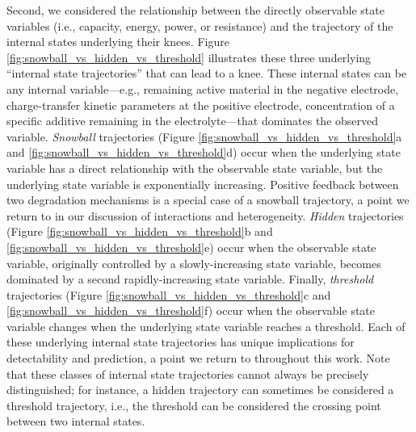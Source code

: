 \documentclass[journal=jpclcd,manuscript=article]{achemso}
\begin{document}
Second, we considered the relationship between the directly observable state variables (i.e., capacity, energy, power, or resistance) and the trajectory of the internal states underlying their knees.
Figure \ref{fig:snowball_vs_hidden_vs_threshold} illustrates these three underlying ``internal state trajectories'' that can lead to a knee.
These internal states can be any internal variable---e.g., remaining active material in the negative electrode, charge-transfer kinetic parameters at the positive electrode, concentration of a specific additive remaining in the electrolyte---that dominates the observed variable.
\textit{Snowball} trajectories (Figure \ref{fig:snowball_vs_hidden_vs_threshold}a and \ref{fig:snowball_vs_hidden_vs_threshold}d) occur when the underlying state variable has a direct relationship with the observable state variable, but the underlying state variable is exponentially increasing.
Positive feedback between two degradation mechanisms is a special case of a snowball trajectory, a point we return to in our discussion of interactions and heterogeneity.
\textit{Hidden} trajectories (Figure \ref{fig:snowball_vs_hidden_vs_threshold}b and \ref{fig:snowball_vs_hidden_vs_threshold}e) occur when the observable state variable, originally controlled by a slowly-increasing state variable, becomes dominated by a second rapidly-increasing state variable.
Finally, \textit{threshold} trajectories (Figure \ref{fig:snowball_vs_hidden_vs_threshold}c and \ref{fig:snowball_vs_hidden_vs_threshold}f) occur when the observable state variable changes when the underlying state variable reaches a threshold. Each of these underlying internal state trajectories has unique implications for detectability and prediction, a point we return to throughout this work. Note that these classes of internal state trajectories cannot always be precisely distinguished; for instance, a hidden trajectory can sometimes be considered a threshold trajectory, i.e., the threshold can be considered the crossing point between two internal states.
\end{document}
